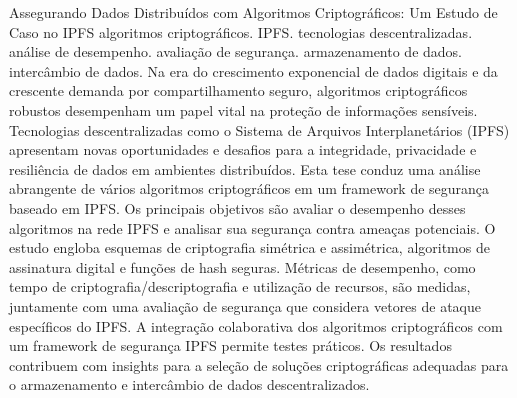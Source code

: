 \documentclass[cic,tc,english]{iiufrgs}
\begin{document}
\begin{abstract}
    In the era of exponential digital data growth and increasing demand for
    secure data sharing, robust cryptographic algorithms play a vital role in
    safeguarding sensitive information. Decentralized technologies like the
    InterPlanetary File System (IPFS) present new opportunities and challenges
    for data integrity, privacy, and resilience in distributed environments.
    This thesis conducts a comprehensive analysis of various cryptographic
    algorithms within an IPFS-based security framework. The primary objectives
    are to assess the performance of these algorithms in the IPFS network and
    evaluate their security against potential threats. The study encompasses
    symmetric and asymmetric encryption schemes, digital signature algorithms,
    and secure hashing functions. Performance metrics, including
    encryption/decryption time and resource utilization, are measured, alongside
    a security evaluation considering IPFS-specific attack vectors.
    Collaboratively integrating the cryptographic algorithms with an IPFS
    security framework allows practical testing. The findings contribute
    insights into selecting appropriate cryptographic solutions for
    decentralized data storage and exchange.
\end{abstract}

\begin{translatedabstract}
    { %
        Assegurando Dados Distribuídos com Algoritmos Criptográficos: Um Estudo de 
        Caso no IPFS
    }{ %
        algoritmos criptográficos. 
        IPFS. 
        tecnologias descentralizadas. 
        análise de desempenho. 
        avaliação de segurança. 
        armazenamento de dados. 
        intercâmbio de dados.
    }
    Na era do crescimento exponencial de dados digitais e da crescente demanda 
    por compartilhamento seguro, algoritmos criptográficos robustos desempenham 
    um papel vital na proteção de informações sensíveis. Tecnologias 
    descentralizadas como o Sistema de Arquivos Interplanetários (IPFS) 
    apresentam novas oportunidades e desafios para a integridade, privacidade 
    e resiliência de dados em ambientes distribuídos. Esta tese conduz uma 
    análise abrangente de vários algoritmos criptográficos em um framework de 
    segurança baseado em IPFS. Os principais objetivos são avaliar o desempenho 
    desses algoritmos na rede IPFS e analisar sua segurança contra ameaças 
    potenciais. O estudo engloba esquemas de criptografia simétrica e 
    assimétrica, algoritmos de assinatura digital e funções de hash seguras. 
    Métricas de desempenho, como tempo de criptografia/descriptografia e 
    utilização de recursos, são medidas, juntamente com uma avaliação de 
    segurança que considera vetores de ataque específicos do IPFS. A integração 
    colaborativa dos algoritmos criptográficos com um framework de segurança 
    IPFS permite testes práticos. Os resultados contribuem com insights para a 
    seleção de soluções criptográficas adequadas para o armazenamento e 
    intercâmbio de dados descentralizados.
\end{translatedabstract}
\end{document}
